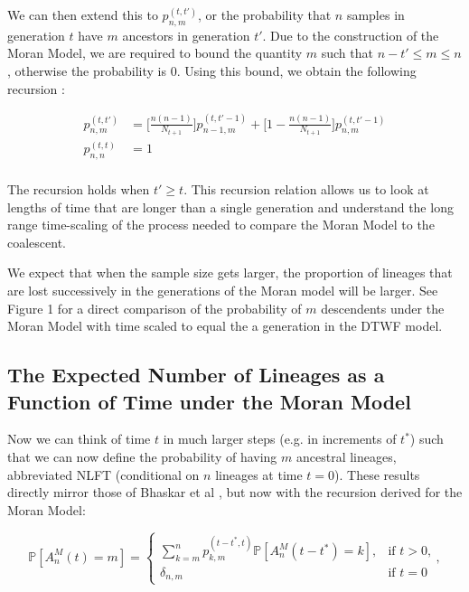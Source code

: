 \documentclass[11pt]{article}
\begin{document}
We can then extend this to $p^{(t, t')}_{n,m}$, or the probability that $n$ samples in generation $t$ have $m$  ancestors in generation $t'$. Due to the construction of the Moran Model, we are required to bound the quantity $m$ such that $n - t' \leq m \leq n$, otherwise the probability is $0$. Using this bound, we obtain the following recursion :

\begin{equation}
\begin{aligned}
	p^{(t, t')}_{n,m} &= \Bigg[\frac{n(n-1)}{N_{t+1}}\Bigg] p^{(t, t'-1)}_{n-1, m} + \Bigg[1 - \frac{n(n-1)}{N_{t+1}}\Bigg] p^{(t, t'-1)}_{n,m}\\
	p^{(t, t)}_{n,n} &= 1\\
\end{aligned}
\end{equation}

The recursion holds when $t' \geq t$. This recursion relation allows us to look at lengths of time that are longer than a single generation and understand the long range time-scaling of the process needed to compare the Moran Model to the coalescent.  

We expect that when the sample size gets larger, the proportion of lineages that are lost successively in the generations of the Moran model will be larger. See Figure 1 for a direct comparison of the probability of $m$ descendents under the Moran Model with time scaled to equal the a generation in the DTWF model. 

\subsection{The Expected Number of Lineages as a Function of Time under the Moran Model}

Now we can think of time $t$ in much larger steps (e.g. in increments of $t^*$) such that we can now define the probability of having $m$ ancestral lineages, abbreviated NLFT (conditional on $n$ lineages at time $t = 0$). These results directly mirror those of Bhaskar et al \citet{Bhaskar2014}, but now with the recursion derived for the Moran Model:

\begin{strip}
\begin{equation}
 \mathbb{P}[A^M_n(t) = m] =
 \begin{cases} 
	 \sum^n_{k=m}  p^{(t-t^*, t)}_{k,m} \mathbb{P}[A^M_n (t-t^*) = k],  &\text{if $t > 0$,}
 	 \\
	 \delta_{n,m} &\text{if $t = 0$}
 \end{cases},
\end{equation}
\end{strip}
\end{document}
